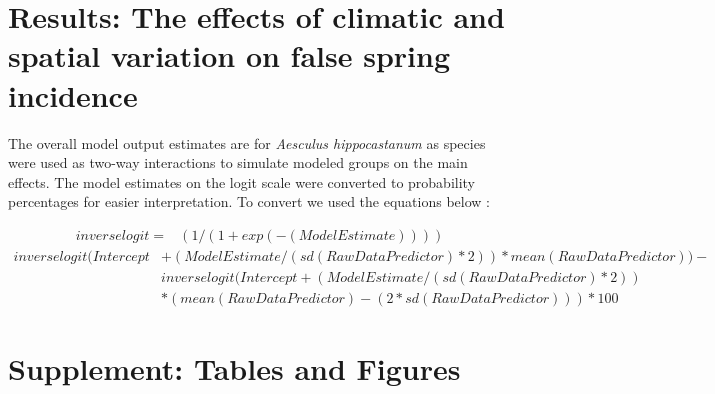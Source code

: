 \documentclass{article}\usepackage[]{graphicx}\usepackage[]{color}
\begin{document}
\section*{Results: The effects of climatic and spatial variation on false spring incidence}
The overall model output estimates are for \textit{Aesculus hippocastanum} as species were used as two-way interactions to simulate modeled groups on the main effects. The model estimates on the logit scale were converted to probability percentages for easier interpretation. To convert we used the equations below \citep{Gelman2006}:

\begin{align*}
inverselogit = & (1/(1+exp(-(Model Estimate)))) \tag{S2} 
\end{align*}
\begin{align*}
inverselogit(Intercept &+ (Model Estimate/(sd(Raw Data Predictor)*2))*mean(Raw Data Predictor)) - \\ & inverselogit(Intercept + (Model Estimate/(sd(Raw Data Predictor)*2)) \\ & *(mean(Raw Data Predictor)-(2*sd(Raw Data Predictor))) * 100 \tag{S3} 
\end{align*}


\newpage
\nocite{NPN2019}


\newpage
\section*{Supplement: Tables and Figures}
  
\end{document}
